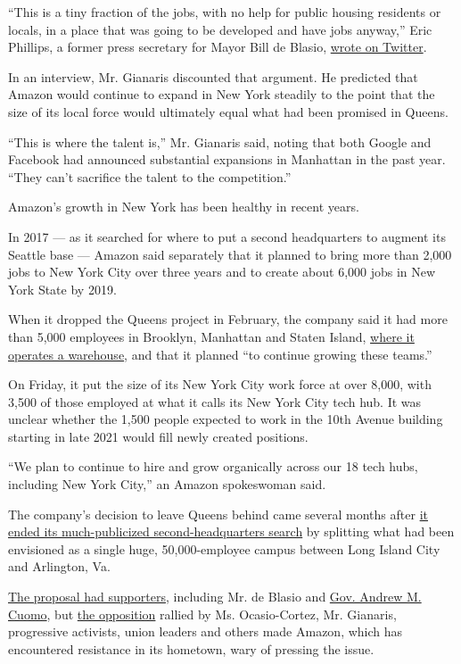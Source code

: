 ``This is a tiny fraction of the jobs, with no help for public housing
residents or locals, in a place that was going to be developed and have
jobs anyway,'' Eric Phillips, a former press secretary for Mayor Bill de
Blasio,
\href{https://twitter.com/EricFPhillips/status/1203107707428974594}{wrote
on Twitter}.

In an interview, Mr. Gianaris discounted that argument. He predicted
that Amazon would continue to expand in New York steadily to the point
that the size of its local force would ultimately equal what had been
promised in Queens.

``This is where the talent is,'' Mr. Gianaris said, noting that both
Google and Facebook had announced substantial expansions in Manhattan in
the past year. ``They can't sacrifice the talent to the competition.''

Amazon's growth in New York has been healthy in recent years.

In 2017 --- as it searched for where to put a second headquarters to
augment its Seattle base --- Amazon said separately that it planned to
bring more than 2,000 jobs to New York City over three years and to
create about 6,000 jobs in New York State by 2019.

When it dropped the Queens project in February, the company said it had
more than 5,000 employees in Brooklyn, Manhattan and Staten Island,
\href{https://www.nytimes.com/2019/03/20/business/economy/amazon-warehouse-labor.html}{where
it operates a warehouse}, and that it planned ``to continue growing
these teams.''

On Friday, it put the size of its New York City work force at over
8,000, with 3,500 of those employed at what it calls its New York City
tech hub. It was unclear whether the 1,500 people expected to work in
the 10th Avenue building starting in late 2021 would fill newly created
positions.

``We plan to continue to hire and grow organically across our 18 tech
hubs, including New York City,'' an Amazon spokeswoman said.

The company's decision to leave Queens behind came several months after
\href{https://www.nytimes.com/2018/11/05/nyregion/amazon-hq2-long-island-city.html}{it
ended its much-publicized second-headquarters search} by splitting what
had been envisioned as a single huge, 50,000-employee campus between
Long Island City and Arlington, Va.

\href{https://www.nytimes.com/2019/02/14/nyregion/amazon-long-island-city.html}{The
proposal had supporters}, including Mr. de Blasio and
\href{https://www.nytimes.com/2019/02/28/nyregion/amazon-hq2-nyc.html}{Gov.
Andrew M. Cuomo}, but
\href{https://www.nytimes.com/2019/02/12/nyregion/amazon-nyc-hq2.html}{the
opposition} rallied by Ms. Ocasio-Cortez, Mr. Gianaris, progressive
activists, union leaders and others made Amazon, which has encountered
resistance in its hometown, wary of pressing the issue.

